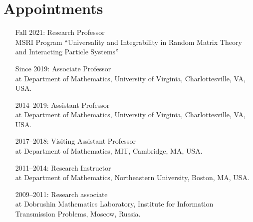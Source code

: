 \documentclass[letterpaper,11pt]{article}
\begin{document}
\section*{Appointments}

\begin{itemize}
	\item [Fall 2021:]
		  Research Professor
		  \\
		  MSRI Program ``Universality and Integrability in Random Matrix Theory and Interacting Particle Systems''
	\item
	      [Since 2019:]
	      Associate Professor\\ at Department of Mathematics, University
	      of Virginia, Charlottesville, VA, USA.
	\item
	      [2014--2019:]
	      Assistant Professor\\ at Department of Mathematics, University
	      of Virginia, Charlottesville, VA, USA.
	\item
	      [2017--2018:]
	      Visiting Assistant Professor\\ at Department of Mathematics, MIT, 
	      Cambridge, MA, USA.
	\item
	      [2011--2014:]
	      Research Instructor\\ at Department of Mathematics, Northeastern
	      University, Boston, MA, USA.
	\item
	      [2009--2011:]
	      Research associate\\ at Dobrushin Mathematics Laboratory,
	      Institute for Information Transmission Problems, Moscow, Russia.
\end{itemize}
\end{document}
